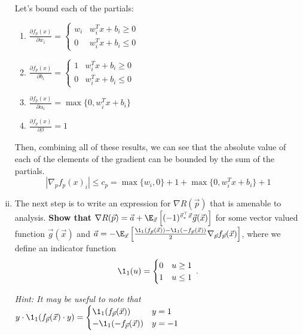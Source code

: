 \documentclass[11pt]{article}
\begin{document}
\begin{Parts}
\begin{enumerate}[(i)]
\begin{tcolorbox}[breakable]
	Let's bound each of the partials:
	\begin{enumerate}
		\item $\frac{\partial f_p(x)}{\partial w_i}=\begin{cases}
		w_i & w_i^Tx+b_i \geq 0\\
		0 & w_i^Tx+b_i \leq 0
		\end{cases}$
		\item $\frac{\partial f_p(x)}{\partial b_i}=\begin{cases}
		1 & w_i^Tx+b_i \geq 0\\
		0 & w_i^Tx+b_i \leq 0
		\end{cases}$
		\item $\frac{\partial f_p(x)}{\partial \alpha_i}=\max\{0,w_i^Tx+b_i\}$
		\item $\frac{\partial f_p(x)}{\partial \beta}=1$
	\end{enumerate}
	Then, combining all of these results, we can see that the absolute value of each of the elements of the gradient can be bounded by the sum of the partials. 
	$$|\nabla_pf_p(x)_i| \leq c_p = \max\{w_i,0\}+1+\max\{0,w_i^Tx+b_i\}+1$$
\end{tcolorbox}

\item The next step is to write an expression for $\nabla R(\vec p)$ that is amenable to analysis. {\bf Show that} $\nabla R(\vec p) = \vec a + \E_{\vec x}\left[(-1)^{\vec v_*^\top\vec x} \vec g(\vec x)\right]$ for some vector valued function $\vec g(\vec x)$ and $\vec a = -\E_{\vec x}\left[ \frac{\1_1(f_{\vec p}(\vec x))-\1_1(-f_{\vec p}(\vec x))}{2} \nabla_{\vec p}f_{\vec p}(\vec x) \right]$, where we define an indicator function
\[\1_1(u) = \begin{cases}0 & u \geq 1\\ 1 & u\leq 1\end{cases}\:.\]

\emph{Hint: It may be useful to note that $y\cdot\1_1(f_{\vec{p}}(\vec x)\cdot y) = \begin{cases} \1_1(f_{\vec{p}}(\vec x)) & y = 1\\ -\1_1(-f_{\vec{p}}(\vec x)) & y = -1 \end{cases} $} 


\end{enumerate}
\end{Parts}
\end{document}
